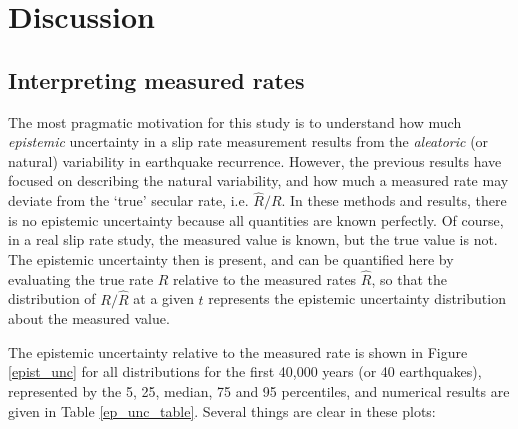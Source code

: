\documentclass[se]{copernicus}
\begin{document}
\section{Discussion}\label{discussion}

\subsection{Interpreting measured rates}\label{interpreting-measured-rates}

The most pragmatic motivation for this study is to understand how much
\emph{epistemic} uncertainty in a slip rate measurement results from the
\emph{aleatoric} (or natural) variability in earthquake
recurrence. However, the previous results have focused on describing the
natural variability, and how much a measured rate may deviate from the
`true' secular rate, i.e. \(\hat{R}/R\). In these methods and results,
there is no epistemic uncertainty because all quantities are known
perfectly. Of course, in a real slip rate study, the measured value is
known, but the true value is not. The epistemic uncertainty then is
present, and can be quantified here by evaluating the true rate \(R\)
relative to the measured rates \(\hat{R}\), so that the distribution of
\(R / \hat{R}\) at a given \(t\) represents the epistemic uncertainty
distribution about the measured value.

The epistemic uncertainty relative to the measured rate is shown in
Figure \ref{epist_unc} for all distributions for the first 40,000 years
(or 40 earthquakes), represented by the 5, 25, median, 75 and 95
percentiles, and numerical results are given in Table
\ref{ep_unc_table}. Several things are clear in these plots:
\end{document}
